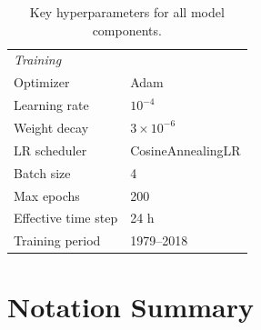 \documentclass[11pt]{article}
\begin{document}
\begin{table}[h]
\begin{tabular}{ll}
\midrule
\multicolumn{2}{l}{\textit{Training}} \\
\quad Optimizer                                        & Adam \\
\quad Learning rate                                    & $10^{-4}$ \\
\quad Weight decay                                     & $3\times10^{-6}$ \\
\quad LR scheduler                                     & CosineAnnealingLR \\
\quad Batch size                                       & 4 \\
\quad Max epochs                                       & 200 \\
\quad Effective time step                              & 24 h \\
\quad Training period                                  & 1979--2018 \\
\bottomrule
\end{tabular}
\caption{Key hyperparameters for all model components.}
\end{table}

\section{Notation Summary}
\end{document}
